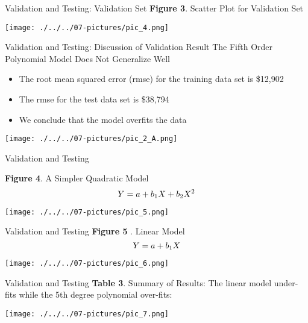 \documentclass[11pt]{beamer}
\begin{document}
\begin{frame}{Validation and Testing: Validation Set}
\textbf{Figure 3}. Scatter Plot for Validation Set
	\begin{center}
	\texttt{[image: ./../../07-pictures/pic\_4.png]}
	\end{center}
\end{frame}
\begin{frame} {Validation and Testing: Discussion of Validation Result}
The Fifth Order Polynomial Model Does Not Generalize Well
	\begin{itemize}
		\item The root mean squared error (rmse) for the training      data set is \$12,902
		\item  The rmse for the test data set is \$38,794
		\item   We conclude that the model overfits the data
	\end{itemize}
	\begin{center}
	\texttt{[image: ./../../07-pictures/pic\_2\_A.png]}
	\end{center}
\end{frame}
\begin{frame}{Validation and Testing}

\textbf{Figure 4}. A Simpler Quadratic Model
	\begin{equation}
	Y = a + b_1X + b_2X^2 \notag
	\end{equation}		
	 
	\begin{center}
	\texttt{[image: ./../../07-pictures/pic\_5.png]}
	\end{center}
\end{frame}
\begin{frame}{Validation and Testing}
\textbf{Figure 5 }. Linear Model
	\begin{equation}
		Y = a + b_1X \notag
	\end{equation}
	\begin{center}
	\texttt{[image: ./../../07-pictures/pic\_6.png]}
	\end{center}
\end{frame}
\begin{frame}{Validation and Testing}
\textbf{Table 3}. Summary of Results: The linear model under-fits while the 5th degree polynomial over-fits:
	\begin{center}
	\texttt{[image: ./../../07-pictures/pic\_7.png]}
	\end{center}
\end{frame}
\end{document}

